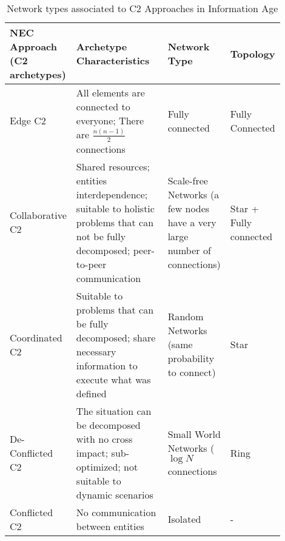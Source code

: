 \begin{table}%
	\small
	\fontsize{6}{6}\selectfont
	\centering
	\caption{Network types associated to C2 Approaches in Information Age}
	\label{table:nec}
	
	\begin{tabular}{p{0.1\linewidth}p{0.5\linewidth}p{0.2\linewidth}p{0.1\linewidth}}
	\hline
		\textbf{NEC Approach (C2 archetypes)}
		& \textbf{Archetype Characteristics}
		& \textbf{Network Type}
		& \textbf{Topology} \\ [1ex]
	\hline	
	Edge C2 & All elements are connected to everyone; There are $\frac{n(n-1)}{2}$ connections & Fully connected & Fully Connected \\[5ex]
	Collaborative C2 & Shared resources; entities interdependence; suitable to holistic problems that can not be fully decomposed; peer-to-peer communication & Scale-free Networks (a few nodes have a very large number of connections) & Star + Fully connected \\[5ex]
	Coordinated C2 & Suitable to problems that can be fully decomposed; share necessary information to execute what was defined & Random Networks (same probability to connect) & Star \\[5ex]
	De-Conflicted C2 & The situation can be decomposed with no cross impact; sub-optimized; not suitable to dynamic scenarios & Small World Networks ( $\log{N}$ connections & Ring \\[5ex]
	Conflicted C2 & No communication between entities & Isolated & - \\[1ex]
	\hline
	\end{tabular}
\end{table} 

